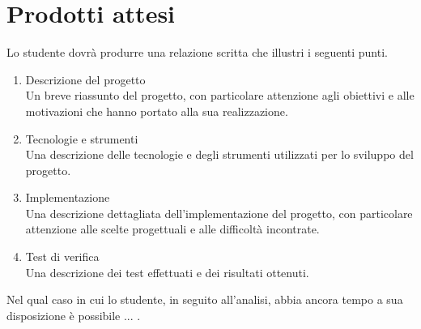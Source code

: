 \section*{Prodotti attesi}
Lo studente dovrà produrre una relazione scritta che illustri i seguenti punti.
\begin{enumerate}
    \item Descrizione del progetto \\
    Un breve riassunto del progetto, con particolare attenzione agli obiettivi e alle motivazioni che hanno portato alla sua realizzazione.
    
    \item Tecnologie e strumenti \\
    Una descrizione delle tecnologie e degli strumenti utilizzati per lo sviluppo del progetto.
    
    \item Implementazione \\
    Una descrizione dettagliata dell'implementazione del progetto, con particolare attenzione alle scelte progettuali e alle difficoltà incontrate.

    \item Test di verifica \\
    Una descrizione dei test effettuati e dei risultati ottenuti.

\end{enumerate}

Nel qual caso in cui lo studente, in seguito all'analisi, abbia ancora tempo a sua disposizione è possibile ... .
